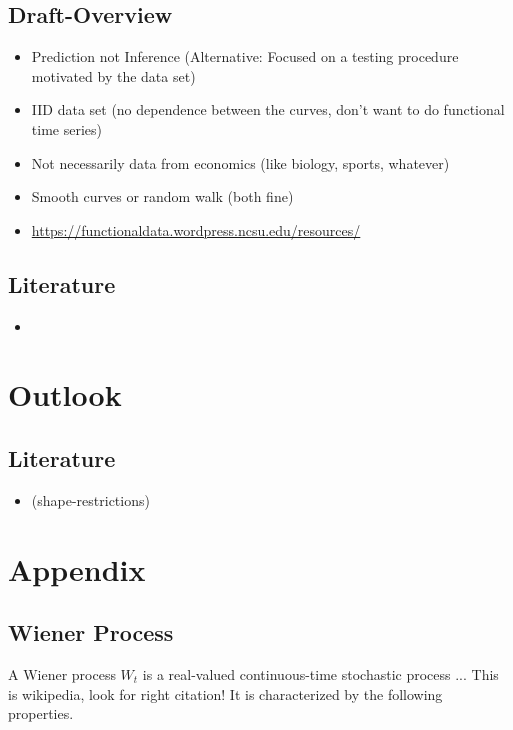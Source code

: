 \documentclass[11pt,twoside,a4paper]{article}
\begin{document}
	\subsection{Draft-Overview}
	\begin{itemize}
		\item Prediction not Inference (Alternative: Focused on a testing procedure motivated by the data set)
		\item IID data set (no dependence between the curves, don't want to do functional time series)
		\item Not necessarily data from economics (like biology, sports, whatever)
		\item Smooth curves or random walk (both fine)
		\item \href{https://functionaldata.wordpress.ncsu.edu/resources/}{https://functionaldata.wordpress.ncsu.edu/resources/}
	\end{itemize}
	
	\subsection{Literature}
	\begin{itemize}
		\item \cite{carey_life_2002}
	\end{itemize}

	\section{Outlook}
	
	\subsection{Literature}
	\begin{itemize}
		\item \cite{James.2009} (shape-restrictions)
	\end{itemize}
	
	\section{Appendix}
	
	\subsection{Wiener Process}\label{Wiener}
	A Wiener process $W_t$ is a real-valued continuous-time stochastic process {\color{red} ... This is wikipedia, look for right citation!}
	It is characterized by the following properties.
	
\end{document}
